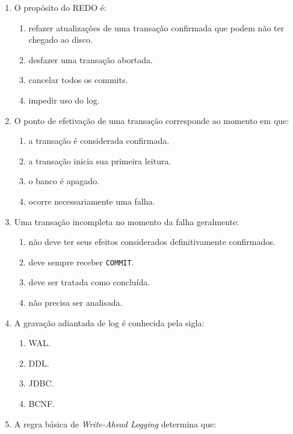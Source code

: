 \documentclass[12pt,a4paper]{article}
\begin{document}
\begin{enumerate}[label=\textbf{Q\arabic*.}]
\item O propósito do REDO é:

\begin{enumerate}[label=\alph*)]
    \item refazer atualizações de uma transação confirmada que podem não ter chegado ao disco.
    \item desfazer uma transação abortada.
    \item cancelar todos os commits.
    \item impedir uso do log.
\end{enumerate}

\item O ponto de efetivação de uma transação corresponde ao momento em que:

\begin{enumerate}[label=\alph*)]
    \item a transação é considerada confirmada.
    \item a transação inicia sua primeira leitura.
    \item o banco é apagado.
    \item ocorre necessariamente uma falha.
\end{enumerate}

\item Uma transação incompleta no momento da falha geralmente:

\begin{enumerate}[label=\alph*)]
    \item não deve ter seus efeitos considerados definitivamente confirmados.
    \item deve sempre receber \texttt{COMMIT}.
    \item deve ser tratada como concluída.
    \item não precisa ser analisada.
\end{enumerate}

\item A gravação adiantada de log é conhecida pela sigla:

\begin{enumerate}[label=\alph*)]
    \item WAL.
    \item DDL.
    \item JDBC.
    \item BCNF.
\end{enumerate}

\item A regra básica de \textit{Write-Ahead Logging} determina que:


\end{enumerate}
\end{document}
